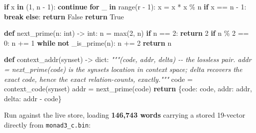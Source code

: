\documentclass[
  10pt,
]{article}
\newenvironment{Shaded}{}{}
\newcommand{\BuiltInTok}[1]{\textcolor[rgb]{0.00,0.50,0.00}{#1}}
\newcommand{\CommentTok}[1]{\textcolor[rgb]{0.38,0.63,0.69}{\textit{#1}}}
\newcommand{\ControlFlowTok}[1]{\textcolor[rgb]{0.00,0.44,0.13}{\textbf{#1}}}
\newcommand{\DecValTok}[1]{\textcolor[rgb]{0.25,0.63,0.44}{#1}}
\newcommand{\KeywordTok}[1]{\textcolor[rgb]{0.00,0.44,0.13}{\textbf{#1}}}
\newcommand{\NormalTok}[1]{#1}
\newcommand{\OperatorTok}[1]{\textcolor[rgb]{0.40,0.40,0.40}{#1}}
\newcommand{\StringTok}[1]{\textcolor[rgb]{0.25,0.44,0.63}{#1}}
\newcommand{\VariableTok}[1]{\textcolor[rgb]{0.10,0.09,0.49}{#1}}
\begin{document}
\begin{Shaded}
\begin{Highlighting}[]
        \ControlFlowTok{if}\NormalTok{ x }\KeywordTok{in}\NormalTok{ (}\DecValTok{1}\NormalTok{, n }\OperatorTok{{-}} \DecValTok{1}\NormalTok{):}
            \ControlFlowTok{continue}
        \ControlFlowTok{for}\NormalTok{ \_ }\KeywordTok{in} \BuiltInTok{range}\NormalTok{(r }\OperatorTok{{-}} \DecValTok{1}\NormalTok{):}
\NormalTok{            x }\OperatorTok{=}\NormalTok{ x }\OperatorTok{*}\NormalTok{ x }\OperatorTok{\%}\NormalTok{ n}
            \ControlFlowTok{if}\NormalTok{ x }\OperatorTok{==}\NormalTok{ n }\OperatorTok{{-}} \DecValTok{1}\NormalTok{:}
                \ControlFlowTok{break}
        \ControlFlowTok{else}\NormalTok{:}
            \ControlFlowTok{return} \VariableTok{False}
    \ControlFlowTok{return} \VariableTok{True}

\KeywordTok{def}\NormalTok{ next\_prime(n: }\BuiltInTok{int}\NormalTok{) }\OperatorTok{{-}\textgreater{}} \BuiltInTok{int}\NormalTok{:}
\NormalTok{    n }\OperatorTok{=} \BuiltInTok{max}\NormalTok{(}\DecValTok{2}\NormalTok{, n)}
    \ControlFlowTok{if}\NormalTok{ n }\OperatorTok{==} \DecValTok{2}\NormalTok{:}
        \ControlFlowTok{return} \DecValTok{2}
    \ControlFlowTok{if}\NormalTok{ n }\OperatorTok{\%} \DecValTok{2} \OperatorTok{==} \DecValTok{0}\NormalTok{:}
\NormalTok{        n }\OperatorTok{+=} \DecValTok{1}
    \ControlFlowTok{while} \KeywordTok{not}\NormalTok{ \_is\_prime(n):}
\NormalTok{        n }\OperatorTok{+=} \DecValTok{2}
    \ControlFlowTok{return}\NormalTok{ n}

\KeywordTok{def}\NormalTok{ context\_addr(synset) }\OperatorTok{{-}\textgreater{}} \BuiltInTok{dict}\NormalTok{:}
    \CommentTok{"""(code, addr, delta) {-}{-} the lossless pair. addr = next\_prime(code)}
\CommentTok{    is the synset\textquotesingle{}s location in context space; delta recovers the exact}
\CommentTok{    code, hence the exact relation{-}counts, exactly."""}
\NormalTok{    code }\OperatorTok{=}\NormalTok{ context\_code(synset)}
\NormalTok{    addr }\OperatorTok{=}\NormalTok{ next\_prime(code)}
    \ControlFlowTok{return}\NormalTok{ \{}\StringTok{\textquotesingle{}code\textquotesingle{}}\NormalTok{: code, }\StringTok{\textquotesingle{}addr\textquotesingle{}}\NormalTok{: addr, }\StringTok{\textquotesingle{}delta\textquotesingle{}}\NormalTok{: addr }\OperatorTok{{-}}\NormalTok{ code\}}
\end{Highlighting}
\end{Shaded}

Run against the live store, loading \textbf{146,743 words} carrying a
stored 19-vector directly from \texttt{monad3\_c.bin}:
\end{document}
